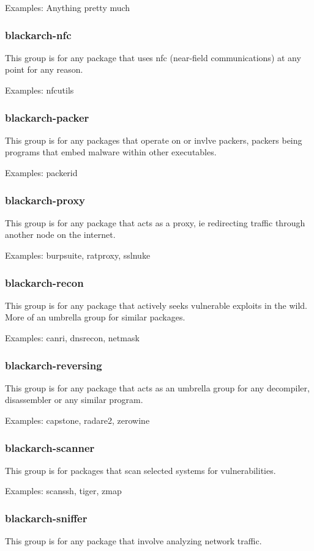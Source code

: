 \documentclass[a4paper, oneside, 11pt]{book}
\begin{document}
Examples: Anything pretty much

\subsubsection{blackarch-nfc}
This group is for any package that uses nfc (near-field communications) at any
point for any reason.

Examples: nfcutils

\subsubsection{blackarch-packer}
This group is for any packages that operate on or invlve packers, packers being
programs that embed malware within other executables.

Examples: packerid

\subsubsection{blackarch-proxy}
This group is for any package that acts as a proxy, ie redirecting traffic
through another node on the internet.

Examples: burpsuite, ratproxy, sslnuke

\subsubsection{blackarch-recon}
This group is for any package that actively seeks vulnerable exploits in the
wild. More of an umbrella group for similar packages.

Examples: canri, dnsrecon, netmask

\subsubsection{blackarch-reversing}
This group is for any package that acts as an umbrella group for any decompiler,
disassembler or any similar program.

Examples: capstone, radare2, zerowine

\subsubsection{blackarch-scanner}
This group is for packages that scan selected systems for vulnerabilities.

Examples: scanssh, tiger, zmap

\subsubsection{blackarch-sniffer}
This group is for any package that involve analyzing network traffic.
\end{document}
